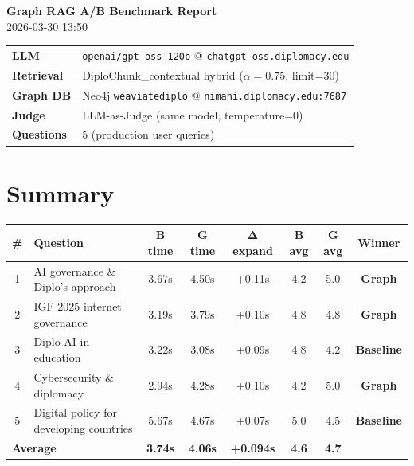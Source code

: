 \documentclass[11pt,a4paper]{article}
\newcommand{\winner}[1]{\textbf{\textcolor{graphwin}{#1}}}
\newcommand{\basewinner}[1]{\textbf{\textcolor{basewin}{#1}}}
\begin{document}
\begin{center}
{\LARGE\sffamily\bfseries Graph RAG A/B Benchmark Report}\\[0.5em]
{\large 2026-03-30 13:50}\\[1.5em]
\end{center}

\begin{tabularx}{\textwidth}{@{}lX@{}}
\textbf{LLM} & \texttt{openai/gpt-oss-120b} @ \texttt{chatgpt-oss.diplomacy.edu} \\
\textbf{Retrieval} & DiploChunk\_contextual hybrid ($\alpha=0.75$, limit=30) \\
\textbf{Graph DB} & Neo4j \texttt{weaviatediplo} @ \texttt{nimani.diplomacy.edu:7687} \\
\textbf{Judge} & LLM-as-Judge (same model, temperature=0) \\
\textbf{Questions} & 5 (production user queries) \\
\end{tabularx}
\vspace{1em}

\section{Summary}

\begin{center}
\begin{tabular}{clcccccc}
\toprule
\textbf{\#} & \textbf{Question} & \textbf{B time} & \textbf{G time} & \textbf{Δ expand} & \textbf{B avg} & \textbf{G avg} & \textbf{Winner} \\
\midrule
1 & AI governance \& Diplo's approach & 3.67s & 4.50s & +0.11s & 4.2 & 5.0 & \winner{Graph} \\
2 & IGF 2025 internet governance & 3.19s & 3.79s & +0.10s & 4.8 & 4.8 & \winner{Graph} \\
3 & Diplo AI in education & 3.22s & 3.08s & +0.09s & 4.8 & 4.2 & \basewinner{Baseline} \\
4 & Cybersecurity \& diplomacy & 2.94s & 4.28s & +0.10s & 4.2 & 5.0 & \winner{Graph} \\
5 & Digital policy for developing countries & 5.67s & 4.67s & +0.07s & 5.0 & 4.5 & \basewinner{Baseline} \\
\midrule
\multicolumn{2}{l}{\textbf{Average}} & \textbf{3.74s} & \textbf{4.06s} & \textbf{+0.094s} & \textbf{4.6} & \textbf{4.7} & \\
\bottomrule
\end{tabular}
\end{center}
\end{document}
